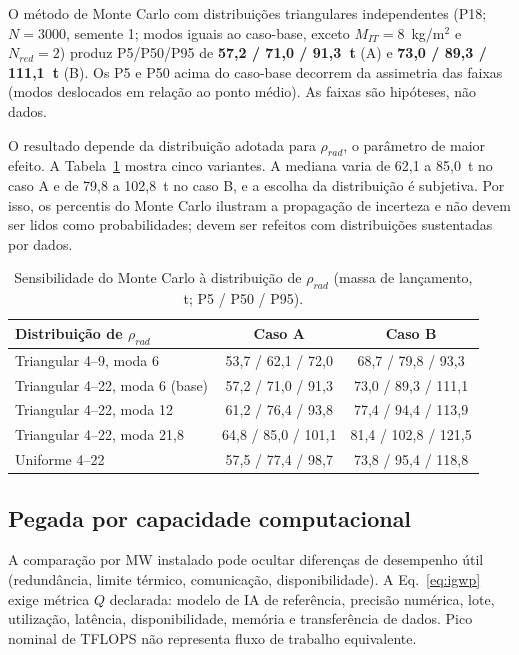 \documentclass[11pt,a4paper]{article}
\begin{document}
O método de Monte Carlo com distribuições triangulares independentes (P18;
$N=3000$, semente 1; modos iguais ao caso-base, exceto $M_{IT}=8$~kg/m$^2$ e
$N_{red}=2$) produz P5/P50/P95 de \textbf{57,2 / 71,0 / 91,3~t} (A) e
\textbf{73,0 / 89,3 / 111,1~t} (B). Os P5 e P50 acima do caso-base decorrem da
assimetria das faixas (modos deslocados em relação ao ponto médio). As faixas
são hipóteses, não dados.

O resultado depende da distribuição adotada para $\rho_{rad}$, o parâmetro de
maior efeito. A Tabela~\ref{tab:mcvar} mostra cinco variantes. A mediana varia
de 62,1 a 85,0~t no caso A e de 79,8 a 102,8~t no caso B, e a escolha da
distribuição é subjetiva. Por isso, os percentis do Monte Carlo ilustram a
propagação de incerteza e não devem ser lidos como probabilidades; devem ser
refeitos com distribuições sustentadas por dados.

\begin{table}[ht]
\centering
\caption{Sensibilidade do Monte Carlo à distribuição de $\rho_{rad}$ (massa de
lançamento, t; P5 / P50 / P95).}
\label{tab:mcvar}
\small
\begin{tabular}{@{}lcc@{}}
\toprule
Distribuição de $\rho_{rad}$ & Caso A & Caso B\\
\midrule
Triangular 4--9, moda 6           & 53,7 / 62,1 / 72,0 & 68,7 / 79,8 / 93,3\\
Triangular 4--22, moda 6 (base)   & 57,2 / 71,0 / 91,3 & 73,0 / 89,3 / 111,1\\
Triangular 4--22, moda 12         & 61,2 / 76,4 / 93,8 & 77,4 / 94,4 / 113,9\\
Triangular 4--22, moda 21,8       & 64,8 / 85,0 / 101,1 & 81,4 / 102,8 / 121,5\\
Uniforme 4--22                    & 57,5 / 77,4 / 98,7 & 73,8 / 95,4 / 118,8\\
\bottomrule
\end{tabular}
\end{table}

\subsection{Pegada por capacidade computacional}

A comparação por MW instalado pode ocultar diferenças de desempenho útil
(redundância, limite térmico, comunicação, disponibilidade). A
Eq.~\eqref{eq:igwp} exige métrica $Q$ declarada: modelo de IA de referência,
precisão numérica, lote, utilização, latência, disponibilidade, memória e
transferência de dados. Pico nominal de TFLOPS não representa fluxo de trabalho
equivalente.
\end{document}
